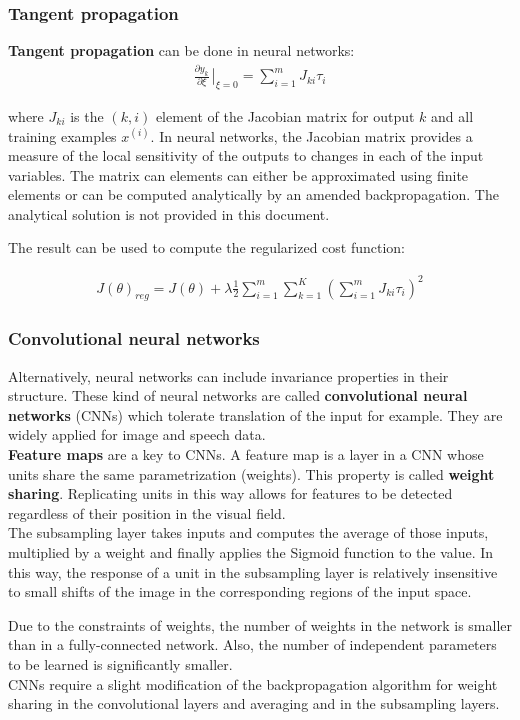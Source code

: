 \documentclass{report}
\begin{document}
\subsubsection{Tangent propagation}
{\bf Tangent propagation} can be done in neural networks:
\begin{align*}
\frac{\partial y_k}{\partial \xi}\left.{\!\!\frac{}{}}\right |_{\xi=0} = \sum_{i=1}^{m} J_{ki}\tau_{i}
\end{align*}

where $J_{ki}$ is the $(k,i)$ element of the Jacobian matrix for output $k$ and all training examples $x^{(i)}$.
In neural networks, the Jacobian matrix provides a measure of the local sensitivity of the outputs to changes in each of the input variables.
The matrix can elements can either be approximated using finite elements or can be computed analytically by an amended backpropagation.
The analytical solution is not provided in this document.

The result can be used to compute the regularized cost function:

\begin{align*}
J(\theta)_{reg} = J(\theta) + \lambda \frac{1}{2} \sum_{i=1}^{m} \sum_{k=1}^{K} (\sum_{i=1}^{m} J_{ki}\tau_{i})^2
\end{align*}

\subsubsection{Convolutional neural networks}
Alternatively, neural networks can include invariance properties in their structure.
These kind of neural networks are called {\bf convolutional neural networks} (CNNs) which tolerate translation of the input for example.
They are widely applied for image and speech data. \\
{\bf Feature maps} are a key to CNNs. A feature map is a layer in a CNN whose units share the same parametrization (weights). This property is called {\bf weight sharing}.
Replicating units in this way allows for features to be detected regardless of their position in the visual field.\\
The subsampling layer takes inputs and computes the average of those inputs, multiplied by a weight and finally applies the Sigmoid function to the value.
In this way, the response of a unit in the subsampling layer is relatively insensitive to small shifts of the image in the corresponding regions of the input space.


Due to the constraints of weights, the number of weights in the network is smaller than in a fully-connected network.
Also, the number of independent parameters to be learned is significantly smaller. \\
CNNs require a slight modification of the backpropagation algorithm for weight sharing in the convolutional layers and averaging and in the subsampling layers.
\end{document}
